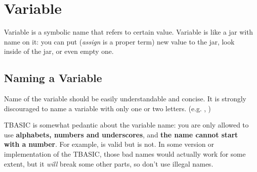 \section{Variable}

Variable is a symbolic name that refers to certain value. Variable is like a jar with name on it: you can put (\emph{assign} is a proper term) new value to the jar, look inside of the jar, or even empty one.

\subsection{Naming a Variable}

Name of the variable should be easily understandable and concise. It is strongly discouraged to name a variable with only one or two letters. (e.g. , )

TBASIC is somewhat pedantic about the variable name: you are only allowed to use \textbf{alphabets, numbers and underscores}, and \textbf{the name cannot start with a number}. For example,  is valid but  is not. In some version or implementation of the TBASIC, those bad names would actually work for some extent, but it \emph{will} break some other parts, so don't use illegal names.